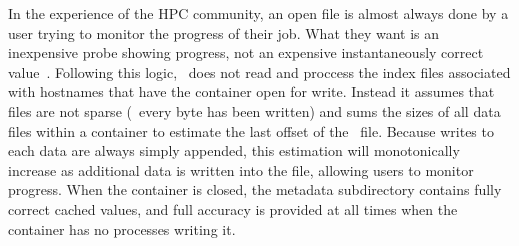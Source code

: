 In the experience of the HPC community,  an open file is
almost always done by a user trying to monitor the progress of their job. What
they want is an inexpensive probe showing progress, not an expensive
instantaneously correct value~\cite{hec-posix}. Following this logic, \plfs\
does not read and proccess the index files associated with hostnames that have
the container open for write. Instead it assumes that files are not sparse
(\ie\ every byte has been written) and sums the sizes of all data files within
a container to estimate the last offset of the \plfs\ file.  Because writes to
each data are always simply appended, this estimation will monotonically
increase as additional data is written into the file, allowing users to monitor
progress. When the container is closed, the metadata subdirectory contains
fully correct cached values, and full accuracy is provided at all times when
the container has no processes writing it.
